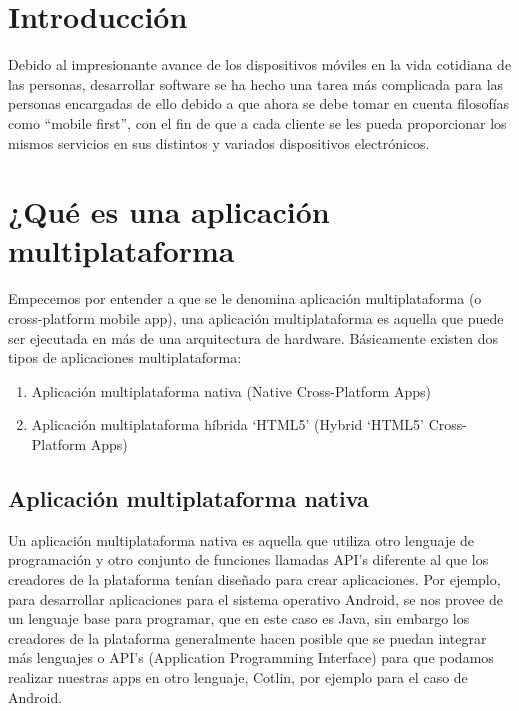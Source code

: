 \documentclass[a4paper,12pt]{mylib/publicacion}
\begin{document}
\selectfont
\putLogo
{\protecoTitle}

\section{Introducción}

Debido al impresionante avance de los dispositivos móviles en la vida cotidiana de las personas, desarrollar software se ha hecho una tarea más complicada para las personas encargadas de ello debido a que ahora se debe tomar en cuenta filosofías como “mobile first”, con el fin de que a cada cliente se les pueda proporcionar los mismos servicios en sus
distintos y variados dispositivos electrónicos.

\section{¿Qué es una aplicación multiplataforma}

Empecemos por entender a que se le denomina aplicación multiplataforma (o
cross-platform mobile app), una aplicación multiplataforma es aquella que puede ser ejecutada en más de una arquitectura de hardware.
Básicamente existen dos tipos de aplicaciones multiplataforma:

\begin{enumerate}
  \item Aplicación multiplataforma nativa (Native Cross-Platform Apps)
  \item Aplicación multiplataforma híbrida ‘HTML5’ (Hybrid ‘HTML5’ Cross-Platform Apps)
\end{enumerate}

\subsection{Aplicación multiplataforma nativa}

Un aplicación multiplataforma nativa es aquella que utiliza otro lenguaje de programación y otro conjunto de funciones llamadas API’s diferente al que los creadores de la plataforma tenían diseñado para crear aplicaciones.
Por ejemplo, para desarrollar aplicaciones para el sistema operativo Android, se nos provee de un lenguaje base para programar, que en este caso es Java, sin embargo los creadores de la plataforma generalmente hacen posible que se puedan integrar más lenguajes o API’s (Application Programming Interface) para que podamos realizar nuestras apps en otro
lenguaje, Cotlin, por ejemplo para el caso de Android.
\end{document}
